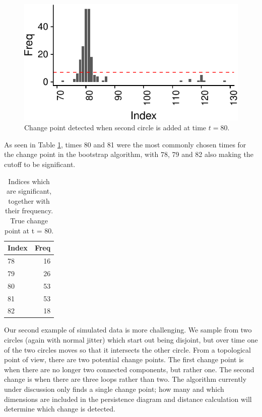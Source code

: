 \documentclass[smallextended]{svjour3}       %
\begin{document}
\begin{example}
\begin{figure}[H]\includegraphics{springer_template_files/figure-latex/unnamed-chunk-1-1} 
\caption{Change point detected when second circle is added at time $t = 80$.}
\label{fig:6}\end{figure}

As seen in Table \ref{tab:unnamed-chunk-2}, times 80 and 81 were the most commonly chosen times for the change point in the bootstrap algorithm, with 78, 79 and 82 also making the cutoff to be significant. 
\begin{longtable}[t]{lr}
\caption{\label{tab:unnamed-chunk-2}Indices which are significant, together with their frequency. True change point at t = 80.}\\
\toprule
Index & Freq\\
\midrule
78 & 16\\
79 & 26\\
80 & 53\\
81 & 53\\
82 & 18\\
\bottomrule
\end{longtable}

Our second example of simulated data is more challenging. We sample from two circles (again with normal jitter) which start out being disjoint, but over time one of the two circles moves so that it intersects the other circle. From a topological
point of view, there are two potential change points. The first change
point is when there are no longer two connected components, but rather
one. The second change is when there are three loops rather than two.
The algorithm currently under discussion only finds a single change
point; how many and which dimensions are included in the persistence
diagram and distance calculation will determine which change is
detected.


\end{example}
\end{document}
